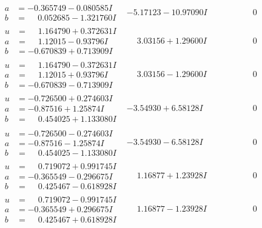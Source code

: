 \documentclass[1p]{elsarticle_modified}
\theoremstyle{definition}
\begin{document}
$$\begin{array}{c|c|c}
\begin{aligned}
a &= -0.365749 - 0.080585 I \\
b &= \phantom{-}0.052685 - 1.321760 I\end{aligned}
 & -5.17123 - 10.97090 I & \phantom{-0.000000 } 0 \\ \hline\begin{aligned}
u &= \phantom{-}1.164790 + 0.372631 I \\
a &= \phantom{-}1.12015 - 0.93796 I \\
b &= -0.670839 + 0.713909 I\end{aligned}
 & \phantom{-}3.03156 + 1.29600 I & \phantom{-0.000000 } 0 \\ \hline\begin{aligned}
u &= \phantom{-}1.164790 - 0.372631 I \\
a &= \phantom{-}1.12015 + 0.93796 I \\
b &= -0.670839 - 0.713909 I\end{aligned}
 & \phantom{-}3.03156 - 1.29600 I & \phantom{-0.000000 } 0 \\ \hline\begin{aligned}
u &= -0.726500 + 0.274603 I \\
a &= -0.87516 + 1.25874 I \\
b &= \phantom{-}0.454025 + 1.133080 I\end{aligned}
 & -3.54930 + 6.58128 I & \phantom{-0.000000 } 0 \\ \hline\begin{aligned}
u &= -0.726500 - 0.274603 I \\
a &= -0.87516 - 1.25874 I \\
b &= \phantom{-}0.454025 - 1.133080 I\end{aligned}
 & -3.54930 - 6.58128 I & \phantom{-0.000000 } 0 \\ \hline\begin{aligned}
u &= \phantom{-}0.719072 + 0.991745 I \\
a &= -0.365549 - 0.296675 I \\
b &= \phantom{-}0.425467 - 0.618928 I\end{aligned}
 & \phantom{-}1.16877 + 1.23928 I & \phantom{-0.000000 } 0 \\ \hline\begin{aligned}
u &= \phantom{-}0.719072 - 0.991745 I \\
a &= -0.365549 + 0.296675 I \\
b &= \phantom{-}0.425467 + 0.618928 I\end{aligned}
 & \phantom{-}1.16877 - 1.23928 I & \phantom{-0.000000 } 0 \\ \hline\begin{aligned}

\end{aligned}
\end{array}$$
\end{document}

